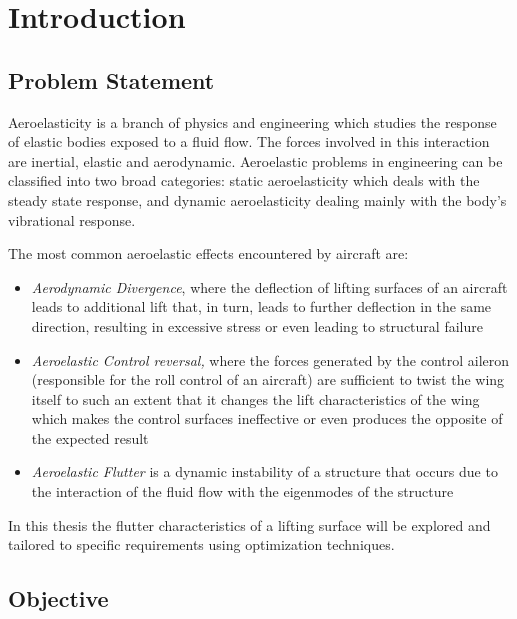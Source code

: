 \setcounter{chapter}{0}
\chapter{Introduction}\label{introduction}


\section{Problem Statement}\label{problem-statement}

Aeroelasticity is a branch of physics and engineering which studies the
response of elastic bodies exposed to a fluid flow. The forces involved
in this interaction are inertial, elastic and aerodynamic. Aeroelastic
problems in engineering can be classified into two broad categories:
static aeroelasticity which deals with the steady state response, and
dynamic aeroelasticity dealing mainly with the body's vibrational
response.

The most common aeroelastic effects encountered by aircraft are:

\begin{itemize}
\item
  \emph{Aerodynamic Divergence}, where the deflection of lifting
  surfaces of an aircraft leads to additional lift that, in turn, leads
  to further deflection in the same direction, resulting in excessive
  stress or even leading to structural failure
\item
  \emph{Aeroelastic Control reversal,} where the forces generated by the
  control aileron (responsible for the roll control of an aircraft) are
  sufficient to twist the wing itself to such an extent that it changes
  the lift characteristics of the wing which makes the control surfaces
  ineffective or even produces the opposite of the expected result
\item
  \emph{Aeroelastic Flutter} is a dynamic instability of a structure
  that occurs due to the interaction of the fluid flow with the
  eigenmodes of the structure
\end{itemize}

In this thesis the flutter characteristics of a lifting surface will be
explored and tailored to specific requirements using optimization
techniques.

\section{Objective}\label{objective}

